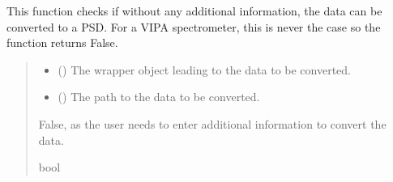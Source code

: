 \documentclass[letterpaper,10pt,english]{sphinxmanual}
\begin{document}
\begin{fulllineitems}
\label{\detokenize{source/HDF5_BLS:HDF5_BLS.conversion_PSD.check_conversion_VIPA}}
\pysigstartsignatures
\pysiglinewithargsret
{}
{\sphinxparamcomma {}}
{}
\pysigstopsignatures
\sphinxAtStartPar
This function checks if without any additional information, the data can be converted to a PSD. For a VIPA spectrometer, this is never the case so the function returns False.
\begin{quote}\begin{description}
\begin{itemize}
\item {} 
\sphinxAtStartPar
{} ({\hyperref[\detokenize{source/HDF5_BLS:HDF5_BLS.wrapper.Wrapper}]{}}) \textendash{} The wrapper object leading to the data to be converted.

\item {} 
\sphinxAtStartPar
{} () \textendash{} The path to the data to be converted.

\end{itemize}

\sphinxAtStartPar
False, as the user needs to enter additional information to convert the data.

\sphinxAtStartPar
bool

\end{description}\end{quote}

\end{fulllineitems}

\end{document}
